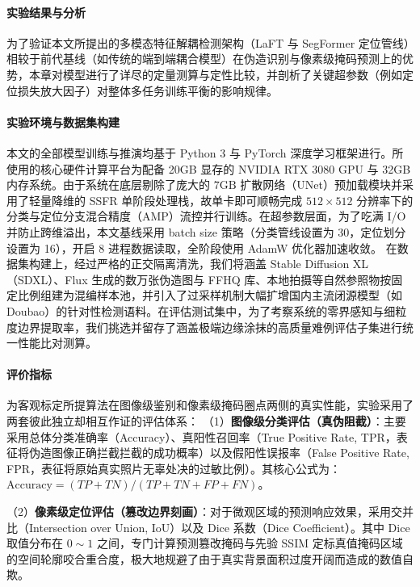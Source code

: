 \documentclass[10pt,a4paper,twocolumn]{ctexart}
\begin{document}
\paragraph{实验结果与分析}
为了验证本文所提出的多模态特征解耦检测架构（LaFT 与 SegFormer 定位管线）相较于前代基线（如传统的端到端耦合模型）在伪造识别与像素级掩码预测上的优势，本章对模型进行了详尽的定量测算与定性比较，并剖析了关键超参数（例如定位损失放大因子）对整体多任务训练平衡的影响规律。

\paragraph{实验环境与数据集构建}
本文的全部模型训练与推演均基于 Python 3 与 PyTorch 深度学习框架进行。所使用的核心硬件计算平台为配备 20GB 显存的 NVIDIA RTX 3080 GPU 与 32GB 内存系统。由于系统在底层剔除了庞大的 $7\text{GB}$ 扩散网络（UNet）预加载模块并采用了轻量降维的 SSFR 单阶段处理栈，故单卡即可顺畅完成 $512 \times 512$ 分辨率下的分类与定位分支混合精度（AMP）流控并行训练。在超参数层面，为了吃满 I/O 并防止跨维溢出，本文基线采用 batch size 策略（分类管线设置为 30，定位划分设置为 16），开启 $8$ 进程数据读取，全阶段使用 AdamW 优化器加速收敛。
在数据集构建上，经过严格的正交隔离清洗，我们将涵盖 Stable Diffusion XL（SDXL）、Flux 生成的数万张伪造图与 FFHQ 库、本地拍摄等自然参照物按固定比例组建为混编样本池，并引入了过采样机制大幅扩增国内主流闭源模型（如 Doubao）的针对性检测语料。在评估测试集中，为了考察系统的零界感知与细粒度边界提取率，我们挑选并留存了涵盖极端边缘涂抹的高质量难例评估子集进行统一性能比对测算。

\paragraph{评价指标}
为客观标定所提算法在图像级鉴别和像素级掩码圈点两侧的真实性能，实验采用了两套彼此独立却相互作证的评估体系：
（1）\textbf{图像级分类评估（真伪阻截）}：主要采用总体分类准确率（Accuracy）、真阳性召回率（True Positive Rate, TPR，表征将伪造图像正确拦截拦截的成功概率）以及假阳性误报率（False Positive Rate, FPR，表征将原始真实照片无辜处决的过敏比例）。其核心公式为：$\text{Accuracy} = (TP + TN)/(TP + TN + FP + FN)$。

（2）\textbf{像素级定位评估（篡改边界刻画）}：对于微观区域的预测响应效果，采用交并比（Intersection over Union, IoU）以及 Dice 系数（Dice Coefficient）。其中 Dice 取值分布在 $0 \sim 1$ 之间，专门计算预测篡改掩码与先验 SSIM 定标真值掩码区域的空间轮廓咬合重合度，极大地规避了由于真实背景面积过度开阔而造成的数值自欺。
\end{document}
